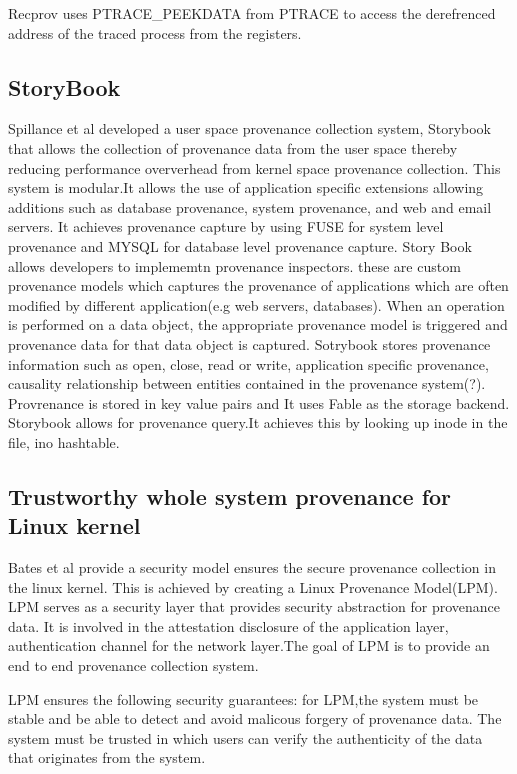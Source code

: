 Recprov uses PTRACE\_PEEKDATA from PTRACE to access the derefrenced address of the traced process from the registers.

\subsection{StoryBook}
Spillance et al developed a user space provenance collection system, Storybook \cite{Rabinovich1995}  that allows the collection of provenance data from the user space thereby reducing performance oververhead from kernel space provenance collection. This system is modular.It allows the use of application specific extensions allowing additions such as database provenance, system provenance, and web and email servers. It achieves provenance capture by using FUSE for system level provenance and MYSQL for database level provenance capture. Story Book allows developers to implememtn provenance inspectors. these are custom provenance models which captures the provenance of applications which are often modified by different application(e.g web servers, databases). When an operation is performed on a data object, the appropriate provenance model is triggered and provenance data for that data object is captured. Sotrybook stores provenance information such as open, close, read or write, application specific provenance, causality relationship between entities contained in the provenance system(?). Provrenance is stored in key value pairs and It uses Fable as the storage backend. Storybook allows for provenance query.It achieves this by looking up inode in the file, ino hashtable.

\subsection{Trustworthy whole system provenance for Linux kernel}

Bates et al provide a security model ensures the secure provenance collection in the linux kernel. This is achieved by creating a Linux Provenance Model(LPM). LPM serves as a security layer that provides security abstraction for provenance data. It is involved in the attestation disclosure of the application layer, authentication channel for the network layer.The goal of LPM is to provide an end to end provenance collection system. 

LPM ensures the following security guarantees: for LPM,the system must be stable and be able to detect and avoid malicous forgery of provenance data. The system must be trusted in which users can verify the authenticity of the data that originates from the system. 

